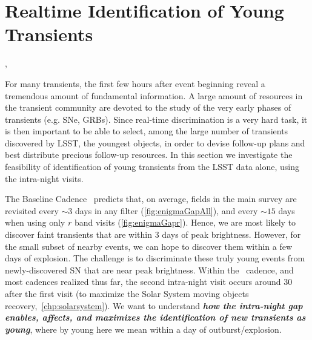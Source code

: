 
%
%
%
%
%
%
%
%

\section{Realtime Identification of Young Transients}
\def\secname{\chpname:transientsAge}\label{sec:\secname}


,  %

For many transients, the first few hours after event beginning reveal a tremendous amount of fundamental information. A large amount of resources in the transient community are devoted to the study of the very early phases of transients (e.g. SNe, GRBs). Since real-time discrimination is a very hard task, it is then important to be able to select, among the large number of transients discovered by LSST, the youngest objects, in order to devise follow-up plans and best distribute precious follow-up resources. In this section we investigate the feasibility of identification of young transients from the LSST data alone, using the intra-night visits.

The Baseline Cadence~ predicts that, on average,
fields in the main survey are revisited every $\sim3$ days in any filter
(\autoref{fig:enigmaGapAll}), and every $\sim15$ days when using only
$r$ band visits (\autoref{fig:enigmaGapr}).  Hence, we are most likely
to discover faint transients that are within 3 days of peak brightness.
However, for the small subset of nearby events, we can hope to discover
them within a few days of explosion.  The challenge is to discriminate
these truly young events from newly-discovered SN that are near peak
brightness.
Within the~ cadence, and most cadences
realized thus far, the second intra-night visit occurs around 30
after the first visit (to maximize the Solar System
moving objects recovery,~\autoref{chp:solarsystem}). We want to understand {\bf\emph{how the intra-night gap enables, affects, and maximizes the identification of new transients as young}}, where by young here we mean within a day of outburst/explosion.

